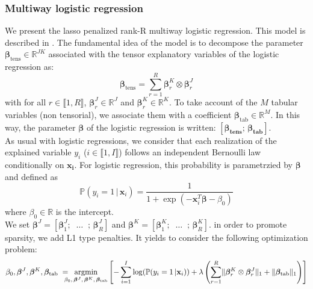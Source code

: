\documentclass[preprint,12pt]{elsarticle}
\begin{document}
\subsubsection{Multiway logistic regression}
\noindent We present the lasso penalized rank-R multiway logistic regression. This model is described in \cite{multi_rank_r}. The fundamental idea of the model is to decompose the parameter $\bm{\beta}_{\text{tens}} \in \mathbb{R}^{JK}$ associated with the tensor explanatory variables of the logistic regression as:
\begin{equation}
    \bm{\beta}_{\text{tens}} = \sum\limits_{r = 1}^R\bm{\beta}_r^K \otimes \bm{\beta}_r^J
\end{equation}
with for all $r \in \llbracket 1 ,R \rrbracket$, $\bm{\beta}_r^J \in \mathbb{R}^J$ and $\bm{\beta}_r^K \in \mathbb{R}^K$. To take account of the $M$ tabular variables (non tensorial), we associate them with a coefficient $\bm{\beta}_{\text{tab}} \in \mathbb{R}^M$. In this way, the parameter $\bm{\beta}$ of the logistic regression is written: $\left[\bm{\beta_{\text{tens}}}; \, \bm{\beta_{\text{tab}}} \right]$.\\
As usual with logistic regressions, we consider that each realization of the explained variable $y_i$ ($i \in \llbracket 1, I \rrbracket$) follows an independent Bernoulli law conditionally on $\mathbf{x_i}$. For logistic regression, this probability is parametrzied by $\bm{\beta}$ and defined as
\begin{equation}
    \label{eqref:vraisemblance}
    \mathbb{P}( y_i = 1\, | \, \mathbf{x}_i) = \frac{1}{1 + \exp(- \mathbf{x}_i^T \bm{\beta} - \beta_0)}
\end{equation}
where  $\beta_0 \in \mathbb{R}$ is the intercept.\\ %

\noindent We set  $\bm{\beta}^J = \left[\bm{\beta}_1^J ; \;\; \hdots \; \; ;\,\bm{\beta}_R^J \right]$ and  $\bm{\beta}^K = \left[\bm{\beta}_1^K; \; \; \hdots \; \; ;\,\bm{\beta}_R^K \right]$.
\vspace{5 pt}
\noindent in order to promote sparsity, we add L1 type penalties. It yields to consider the following optimization problem: %
\begin{equation}
    \beta_0, \bm{\beta}^J, \bm{\beta}^K, \bm{\beta}_{\text{tab}} \; = \hspace{-8pt} \underset{\beta_0 ,\, \bm{\beta}^J, \, \bm{\beta}^K, \, \bm{\beta}_{\text{tab}}}{\text{argmin}} \left[ - \sum\limits_{i = 1}^{I} \log(\mathbb{P}(y_i = 1 \, | \mathbf{x}_i)) + \lambda \left(\sum\limits_{r = 1}^R
    \lVert \bm{\beta}_r^K \otimes \bm{\beta}_r^J \rVert_1 + \lVert \bm{\beta}_{\text{tab}} \rVert_1 \right)\right]
\end{equation}
\end{document}
